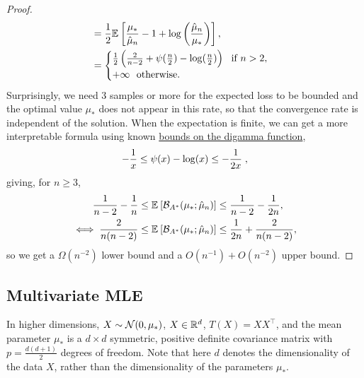 \documentclass[twoside]{article}
\newcommand*{\expect}[2][]{\ensuremath{\mathbb{E}_{#1} \left[ #2 \right] }} %
\newcommand{\logpart}{A}
\newcommand{\bregmanconj}{\cB_{\logpart^*}}
\begin{document}
\begin{proof}
\begin{align}
	&= \half \expect{\frac{\mu_*}{ \hat \mu_n} - 1 + \log \left(\frac{\hat \mu_n}{\mu_*} \right) },
	\\
	& =
	\begin{cases}
		\half \left ( \frac{2}{n-2} +\psi(\half[n]) - \log(\half[n]) \right )  \ \text{ if } n>2, \\
			+\infty \  \text{ otherwise. }
	\end{cases}
	\end{align}
	Surprisingly, we need $3$ samples or more for the expected loss to be bounded and
	the optimal value $\mu_*$ does not appear in this rate, 
	so that the convergence rate is independent of the solution.
	When the expectation is finite, we can get a more interpretable formula using known \href{https://en.wikipedia.org/wiki/Digamma_function#Inequalities}{bounds on the digamma function},
	\begin{align}
		-\frac{1}{x} \leq \psi(x) - \log(x) \leq -\frac{1}{2x}	\; ,
	\end{align}
	giving, for $n\geq 3$,
	\begin{align}
		\inv{n-2} - \inv{n}
		&\leq \expect{\bregmanconj( \mu_*; \hat \mu_n) }
		\leq \inv{n-2} - \inv{2 n},
		\\
		\iff
			\frac{2}{n(n-2)}
			&\leq \expect{\bregmanconj( \mu_*; \hat \mu_n) }
			\leq \inv{2n} +\frac{2}{n(n-2)},
	\end{align}
	so we get a $\Omega(n^{-2})$ lower bound and a $O(n^{-1}) + O(n^{-2})$ upper bound.
	\end{proof}


\subsection{Multivariate MLE}

In higher dimensions, $X \sim {\mathcal N}(0, \mu_*)$, $X\in\mathbb{R}^d$, $T(X) = XX^\top$, and the mean parameter $\mu_*$ 
is a $d \times d$ symmetric, positive definite covariance matrix with $p = \frac{d(d+1)}{2}$ degrees of freedom.
Note that here $d$ denotes the dimensionality of the data $X$, rather than the dimensionality of the parameters $\mu_*$.
\end{document}
